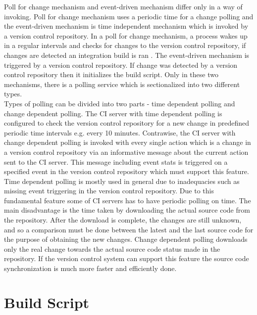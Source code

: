 Poll for change mechanism and event-driven mechanism differ only in a way of invoking. Poll for change mechanism uses a periodic time for a change polling and the event-driven mechanism is time independent mechanism which is invoked by a version control repository. In a poll for change mechanism, a process wakes up in a regular intervals and checks for changes to the version control repository, if changes are detected an integration build is ran \cite{CIbook}. The event-driven mechanism is triggered by a version control repository. If change was detected by a version control repository then it initializes the build script. Only in these two mechanisms, there is a polling service which is sectionalized into two different types.\\

Types of polling can be divided into two parts - time dependent polling and change dependent polling. The CI server with time dependent polling is configured to check the version control repository for a new change in predefined periodic time intervals e.g. every 10 minutes. Contrawise, the CI server with change dependent polling is invoked with every single action which is a change in a version control repository via an informative message about the current action sent to the CI server. This message including event stats is triggered on a specified event in the version control repository which must support this feature.\\

Time dependent polling is mostly used in general due to inadequacies such as missing event triggering in the version control repository. Due to this fundamental feature some of CI servers has to have  periodic polling on time. The main disadvantage is the time taken by downloading the actual source code from the repository. After the download is complete, the changes are still unknown, and so a comparison must be done between the latest and the last source code for the purpose of obtaining the new changes. Change dependent polling downloads only the real change towards the actual source code status made in the repository. If the version control system can support this feature the source code synchronization is much more faster and efficiently done.

\section{Build Script}\label{build_script}

